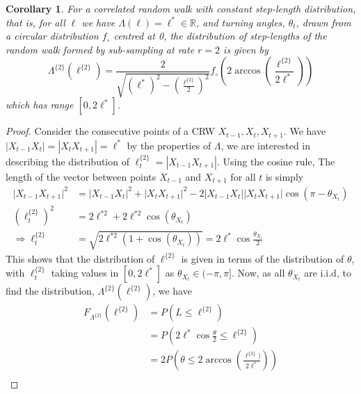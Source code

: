 \documentclass[english]{article}
\newtheorem{corollary}{Corollary}
\begin{document}
\begin{corollary}
    For a correlated random walk with constant step-length distribution, that is, for all $\ell$ we have $\Lambda(\ell)=\ell^*\in \mathbb{R}$, and turning angles, $\theta_t$, drawn from a circular distribution $f_\circ$ centred at 0, the distribution of step-lengths of the random walk formed by sub-sampling at rate $r=2$ is given by \begin{equation}
        \Lambda^{\{2\}}(\ell^{\{2\}})=\frac{2}{\sqrt{(\ell^*)^2-\left(\frac{\ell^{\{2\}}}{2}\right)^2}}f_\circ\left(2\arccos{\left(\frac{\ell^{\{2\}}}{2\ell^*}\right)}\right)
    \end{equation} which has range $[0,2\ell^*]$.  
\end{corollary}
\begin{proof}
Consider the consecutive points of a CRW $X_{t-1},X_t,X_{t+1}$.  We have $|X_{t-1}X_t|=|X_tX_{t+1}|=\ell^*$ by the properties of $\Lambda$, we are interested in describing the distribution of $\ell_t^{\{2\}}=|X_{t-1}X_{t+1}|$.  Using the cosine rule, The length of the vector between points $X_{t-1}$ and $X_{t+1}$ for all $t$ is simply
   \begin{align}\nonumber
     \lvert X_{t-1}X_{t+1}\rvert^2&=\lvert X_{t-1}X_t\rvert^2+\lvert X_{t}X_{t+1}\rvert^2-2\lvert X_{t-1}X_t\rvert\lvert X_{t}X_{t+1}\rvert\cos{\left(\pi-\theta_{X_t}\right)}\\\nonumber
       \left(\ell_t^{\{2\}}\right)^2&=2\ell^{*2}+2\ell^{*2}\cos{\left(\theta_{X_t}\right)}\\
       \Rightarrow \ell_t^{\{2\}}&=\sqrt{2\ell^{*2}(1+\cos{\left(\theta_{X_t}\right)})}=2\ell^*\cos{\frac{\theta_{X_t}}{2}}
       \label{eqn: 12}
   \end{align}
This shows that the distribution of $\ell^{\{2\}}$ is given in terms of the distribution of $\theta$, with $\ell_t^{\{2\}}$ taking values in $[0,2\ell^*]$ as $\theta_{X_t}\in(-\pi,\pi]$.  Now, as all $\theta_{X_t}$ are i.i.d, to find the distribution, $\Lambda^{\{2\}}(\ell^{\{2\}})$, we have
   \begin{align}\nonumber
       F_{\Lambda^{\{2\}}}(\ell^{\{2\}})&=P(L\leq \ell^{\{2\}})\\\nonumber
       &=P\left(2\ell^*\cos{\frac{\theta}{2}}\leq \ell^{\{2\}}\right)\\\nonumber
       &=2P\left(\theta\leq 2\arccos{\left(\frac{\ell^{\{2\}})}{2\ell^*}\right)}\right)\\

\end{align}
\end{proof}
\end{document}
